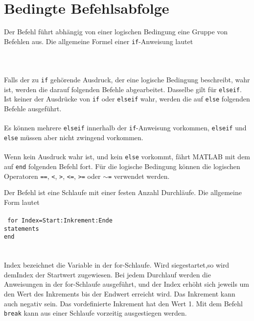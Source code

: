 \section{Bedingte Befehlsabfolge}
Der Befehl  führt abhängig von einer logischen Bedingung eine Gruppe von Befehlen aus. Die allgemeine Formel einer \texttt{if}-Anweisung lautet
\\\\
{}
\\\\
Falls der zu \texttt{if} gehörende Ausdruck, der eine logische Bedingung beschreibt, wahr ist, werden die darauf folgenden Befehle abgearbeitet. Dasselbe gilt für \texttt{elseif}. Ist keiner der Ausdrücke von \texttt{if} oder \texttt{elseif} wahr, werden die auf \texttt{else} folgenden Befehle ausgeführt.
\\\\
Es können mehrere \texttt{elseif} innerhalb der \texttt{if}-Anweisung vorkommen, \texttt{elseif} und \texttt{else} müssen aber nicht zwingend vorkommen.
\\\\
Wenn kein Ausdruck wahr ist, und kein \texttt{else} vorkommt, fährt MATLAB mit dem auf \texttt{end} folgenden Befehl fort. Für die logische Bedingung können die logischen Operatoren {\color{red}\texttt{==}}, {\color{red}\texttt{<}}, {\color{red}\texttt{>}}, {\color{red}\texttt{<=}}, {\color{red}\texttt{>=}} oder {\color{red}\texttt{$\sim$=}} verwendet werden.

Der Befehl  ist eine Schlaufe mit einer festen Anzahl Durchläufe. Die allgemeine Form lautet
\\\\
{\color{red}
\texttt{
for Index=Start:Inkrement:Ende\\
\indent statements\\
end\\
}
}
\\\\
Index bezeichnet die Variable in der for-Schlaufe. Wird siegestartet,so wird demIndex der Startwert zugewiesen. Bei jedem Durchlauf werden die Anweisungen in der for-Schlaufe ausgeführt, und der Index erhöht sich jeweils um den Wert des Inkrements bis der Endwert erreicht wird. Das Inkrement kann auch negativ sein. Das vordefinierte Inkrement hat den Wert 1. Mit dem Befehl {\color{red}\texttt{break}} kann aus einer Schlaufe vorzeitig ausgestiegen werden.
